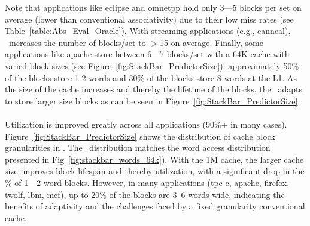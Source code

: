 {\clearpage



Note that applications like eclipse and omnetpp hold only 3---5 blocks per set on average (lower than conventional associativity) due to their low miss rates (see Table~\ref{table:Abs_Eval_Oracle}). With streaming applications (e.g., canneal), \AC\ increases the number of blocks/set to $>$15 on average. Finally, some applications like apache store between 6---7 blocks/set with a 64K cache with varied block sizes (see Figure~\ref{fig:StackBar_PredictorSize}): approximately 50\% of the blocks store 1-2 words and 30\% of the blocks store 8 words at the L1. As the size of the cache increases and thereby the lifetime of the blocks, the \AC\ adapts to store larger size blocks as can be seen in Figure~\ref{fig:StackBar_PredictorSize}.
\\ \\
\indent Utilization is improved greatly across all applications (90\%+ in many cases). Figure~\ref{fig:StackBar_PredictorSize} shows the distribution of cache block granularities in \AC{}. The \AB\ distribution matches the word access distribution presented in Fig~\ref{fig:stackbar_words_64k}). With the 1M cache, the larger cache size improves block lifespan and thereby utilization, with a significant drop in the \% of 1---2 word blocks. However, in many applications (tpc-c, apache, firefox, twolf, lbm, mcf), up to 20\% of the blocks are 3--6 words wide, indicating the benefits of adaptivity and the challenges faced by a fixed granularity conventional cache.

\begin{figure}[!h]
  \centering


\end{figure}}
